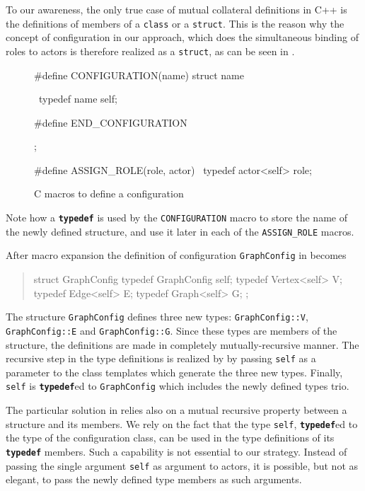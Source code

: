 \documentclass[11pt]{article}
\numberwithin{figure}{section}
\newcommand\CC{\Lang{\mbox{C++}}\xspace}
\newcommand\Lang[1]{\textsc{#1}}
\newcommand{\kw}[1]{\texttt{\textbf{#1}}}
\newcommand{\cd}[1]{\texttt{#1}}
\newenvironment{excerpt}{\begin{quote}\begin{minipage}\textwidth}{\end{minipage}\end{quote}}
\begin{document}
To our awareness, the only true case of mutual collateral definitions
    in \CC{} is the definitions of members of a \cd{class} or a \cd{struct}.
This is the reason why the concept of configuration
    in our approach, which does the simultaneous binding of roles to actors
    is therefore realized as a \cd{struct}, as can be seen
        in .

\begin{figure}[!htb]
\CPP
#define CONFIGURATION(name) struct name { \
    typedef name self;

#define END_CONFIGURATION };

#define ASSIGN_ROLE(role, actor) \
    typedef actor<self> role;
\END\PROGcc{}%
\caption{C macros to define a configuration}
\label{Figure:configuration:Macros}
\end{figure}

Note how a \kw{typedef} is used by the \cd{CONFIGURATION} macro to store
    the name of the newly defined structure, and use it later in each
    of the \cd{ASSIGN\_ROLE} macros.

After macro expansion the definition of
    configuration \cd{GraphConfig} in  becomes
\begin{excerpt}
\CPP
struct GraphConfig {
    typedef GraphConfig self;
    typedef Vertex<self> V;
    typedef Edge<self> E;
    typedef Graph<self> G;
};
\END\PROGcd{}
\end{excerpt}

The structure \cd{GraphConfig} defines three new types: \cd{GraphConfig::V},
    \cd{GraphConfig::E} and \cd{GraphConfig::G}.
Since these types are members of the structure, the definitions
    are made in completely mutually-recursive manner.
The recursive step in the type definitions is realized by
    by passing \cd{self} as a parameter to the class templates which generate the three
    new types.
Finally, \cd{self} is \kw{typedef}ed to \cd{GraphConfig}
    which includes the newly defined types trio.

The particular solution in 
    relies also on a mutual recursive property between a structure
    and its members.
We rely on the fact that the type \cd{self}, \kw{typedef}ed to the type of the
    configuration class, can be used in the type definitions of its \kw{typedef}
    members.
Such a capability is not essential to our strategy.
Instead of passing the single argument \cd{self} as argument to actors,
    it is possible, but not as elegant, to pass the newly defined type members
    as such arguments.
\end{document}
